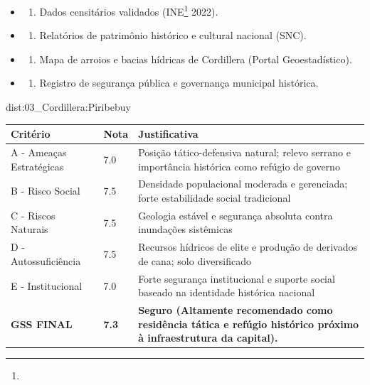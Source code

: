 {\begin{itemize}
\tightlist
\item
  \begin{enumerate}
  \def\labelenumi{\arabic{enumi})}
  \tightlist
  \item
    Dados censitários validados (INE\footnote{\fineINE} 2022).
  \end{enumerate}
\item
  \begin{enumerate}
  \def\labelenumi{\arabic{enumi})}
  \setcounter{enumi}{1}
  \tightlist
  \item
    Relatórios de patrimônio histórico e cultural nacional (SNC).
  \end{enumerate}
\item
  \begin{enumerate}
  \def\labelenumi{\arabic{enumi})}
  \setcounter{enumi}{2}
  \tightlist
  \item
    Mapa de arroios e bacias hídricas de Cordillera (Portal
    Geoestadístico).
  \end{enumerate}
\item
  \begin{enumerate}
  \def\labelenumi{\arabic{enumi})}
  \setcounter{enumi}{3}
  \tightlist
  \item
    Registro de segurança pública e governança municipal histórica.
  \end{enumerate}
\end{itemize}}{dist:03_Cordillera:Piribebuy}
\begin{table}[ht!]
\small \begin{tabular}{p{3.0cm}p{0.8cm}p{6.0cm}} \toprule
\textbf{Critério} & \textbf{Nota} & \textbf{Justificativa} \\ \midrule
A - Ameaças Estratégicas & 7.0 & Posição tático-defensiva natural; relevo serrano e importância histórica como refúgio de governo \\
B - Risco Social & 7.5 & Densidade populacional moderada e gerenciada; forte estabilidade social tradicional \\
C - Riscos Naturais & 7.5 & Geologia estável e segurança absoluta contra inundações sistêmicas \\
D - Autossuficiência & 7.5 & Recursos hídricos de elite e produção de derivados de cana; solo diversificado \\
E - Institucional & 7.0 & Forte segurança institucional e suporte social baseado na identidade histórica nacional \\
\midrule \textbf{GSS FINAL} & \textbf{7.3} & \textbf{Seguro (Altamente recomendado como residência tática e refúgio histórico próximo à infraestrutura da capital).} \\ \bottomrule \end{tabular}
\end{table}
